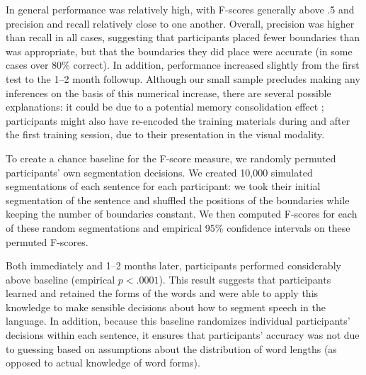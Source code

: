 \documentclass[10pt]{article}
\begin{document}
In general performance was relatively high, with F-scores generally above .5 and precision and recall relatively close to one another. Overall, precision was higher than recall in all cases, suggesting that participants placed fewer boundaries than was appropriate, but that the boundaries they did place were accurate (in some cases over 80\% correct). In addition, performance increased slightly from the first test to the 1--2 month followup. Although our small sample precludes making any inferences on the basis of this numerical increase, there are several possible explanations: it could be due to a potential memory consolidation effect \cite{mcgaugh2000}; participants might also have re-encoded the training materials during and after the first training session, due to their presentation in the visual modality.

To create a chance baseline for the F-score measure, we randomly permuted participants' own segmentation decisions. We created 10,000 simulated segmentations of each sentence for each participant: we took their initial segmentation of the sentence and shuffled the positions of the boundaries while keeping the number of boundaries constant. We then computed F-scores for each of these random segmentations and empirical 95\% confidence intervals on these permuted F-scores. 

Both immediately and 1--2 months later, participants performed considerably above baseline (empirical $p < .0001$). This result suggests that participants learned and retained the forms of the words and were able to apply this knowledge to make sensible decisions about how to segment speech in the language. In addition, because this baseline randomizes individual participants' decisions within each sentence, it ensures that participants' accuracy was not due to guessing based on assumptions about the distribution of word lengths (as opposed to actual knowledge of word forms). 
\end{document}
